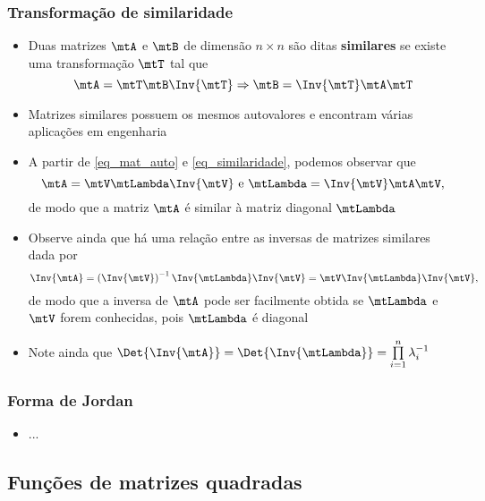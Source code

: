 \begin{frame}
  \frametitle{Transformação de similaridade}
  \begin{itemize}\footnotesize
    \item Duas matrizes $\mtA$ e $\mtB$ de dimensão $n \times n$ são ditas \textbf{similares} se existe uma transformação $\mtT$ tal que
    \begin{equation}\label{eq_similaridade}
      \mtA = \mtT\mtB\Inv{\mtT} \Rightarrow \mtB = \Inv{\mtT}\mtA\mtT
    \end{equation}
    \item Matrizes similares possuem os mesmos autovalores e encontram várias aplicações em engenharia
    \item A partir de \eqref{eq_mat_auto} e \eqref{eq_similaridade}, podemos observar que
    \begin{equation}\label{eq_autosimilar}
      \mtA = \mtV\mtLambda\Inv{\mtV} \text { e } \mtLambda = \Inv{\mtV}\mtA\mtV,
    \end{equation}
    de modo que a matriz $\mtA$ é similar à matriz diagonal $\mtLambda$
    \item Observe ainda que há uma relação entre as inversas de matrizes similares dada por
    \begin{equation}\label{eq_inv_sim}
      \Inv{\mtA} = \left(\Inv{\mtV}\right)^{-1}\Inv{\mtLambda}\Inv{\mtV} = \mtV\Inv{\mtLambda}\Inv{\mtV},
    \end{equation}
    de modo que a inversa de $\mtA$ pode ser facilmente obtida se $\mtLambda$ e $\mtV$ forem conhecidas, pois $\mtLambda$ é diagonal
    \item Note ainda que $\Det{\Inv{\mtA}} = \Det{\Inv{\mtLambda}} = \prod\limits_{i=1}^n\lambda^{-1}_i$
  \end{itemize}
\end{frame}

\begin{frame}
  \frametitle{Forma de Jordan}
  \begin{itemize}
    \item ...
  \end{itemize}
\end{frame}

\subsection{Funções de matrizes quadradas}

